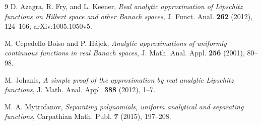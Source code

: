 \documentclass[11pt]{article}
\begin{document}
\begin{thebibliography}{9}
D. Azagra, R. Fry, and L. Keener,
\emph{Real analytic approximation of Lipschitz functions on Hilbert space and
other Banach spaces}, J. Funct. Anal. \textbf{262} (2012), 124--166;
arXiv:1005.1050v5.

M. Cepedello Boiso and P. H\'ajek,
\emph{Analytic approximations of uniformly continuous functions in real
Banach spaces}, J. Math. Anal. Appl. \textbf{256} (2001), 80--98.

M. Johanis,
\emph{A simple proof of the approximation by real analytic Lipschitz
functions}, J. Math. Anal. Appl. \textbf{388} (2012), 1--7.

M. A. Mytrofanov,
\emph{Separating polynomials, uniform analytical and separating functions},
Carpathian Math. Publ. \textbf{7} (2015), 197--208.
\end{thebibliography}
\end{document}
